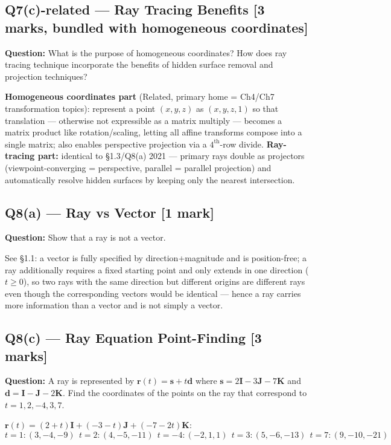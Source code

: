 \documentclass[12pt, a4paper]{article}
\newenvironment{solutionbox}{\begin{mdframed}[style=solutionframe]}{\end{mdframed}}
\newenvironment{answerbox}{\begin{mdframed}[style=answerframe]}{\end{mdframed}}
\begin{document}
\subsection*{Q7(c)-related --- Ray Tracing Benefits [3 marks, bundled with homogeneous coordinates]}
\begin{solutionbox}
\textbf{Question:} What is the purpose of homogeneous coordinates? How does ray tracing technique incorporate the benefits of hidden surface removal and projection techniques?
\end{solutionbox}
\begin{answerbox}
\textbf{Homogeneous coordinates part} (Related, primary home = Ch4/Ch7 transformation topics): represent a point $(x,y,z)$ as $(x,y,z,1)$ so that translation --- otherwise not expressible as a matrix multiply --- becomes a matrix product like rotation/scaling, letting all affine transforms compose into a single matrix; also enables perspective projection via a $4^{\mathrm{th}}$-row divide.
\textbf{Ray-tracing part:} identical to \S1.3/Q8(a) 2021 --- primary rays double as projectors (viewpoint-converging = perspective, parallel = parallel projection) and automatically resolve hidden surfaces by keeping only the nearest intersection.
\end{answerbox}

\subsection*{Q8(a) --- Ray vs Vector [1 mark]}
\begin{solutionbox}
\textbf{Question:} Show that a ray is not a vector.
\end{solutionbox}
\begin{answerbox}
See \S1.1: a vector is fully specified by direction+magnitude and is position-free; a ray additionally requires a fixed starting point and only extends in one direction ($t\ge0$), so two rays with the same direction but different origins are different rays even though the corresponding vectors would be identical --- hence a ray carries more information than a vector and is not simply a vector.
\end{answerbox}

\subsection*{Q8(c) --- Ray Equation Point-Finding [3 marks]}
\begin{solutionbox}
\textbf{Question:} A ray is represented by $\mathbf{r}(t)=\mathbf{s}+t\mathbf{d}$ where $\mathbf{s}=2\mathbf{I}-3\mathbf{J}-7\mathbf{K}$ and $\mathbf{d}=\mathbf{I}-\mathbf{J}-2\mathbf{K}$. Find the coordinates of the points on the ray that correspond to $t=1,2,-4,3,7$.
\end{solutionbox}
\begin{answerbox}
$\mathbf{r}(t)=(2+t)\mathbf{I}+(-3-t)\mathbf{J}+(-7-2t)\mathbf{K}$:
$$t{=}1{:}(3,{-}4,{-}9)\ \ t{=}2{:}(4,{-}5,{-}11)\ \ t{=}{-}4{:}({-}2,1,1)\ \ t{=}3{:}(5,{-}6,{-}13)\ \ t{=}7{:}(9,{-}10,{-}21)$$
\end{answerbox}
\end{document}
